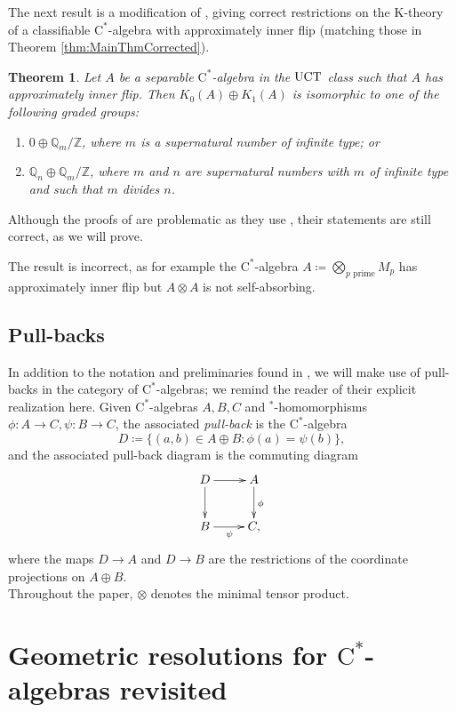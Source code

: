 \documentclass[a4paper,10pt]{amsart}
\newcommand{\T}[1]{\textup{#1}}
\newcommand{\cstar}{\ensuremath{\mathrm C^\ast}}
\newcommand{\Star}{{}^\ast}
\newcounter{theorem}
\newtheorem{thm}[theorem]{Theorem}
\numberwithin{equation}{section}
\numberwithin{theorem}{section}
\newcommand{\Q}{\mathbb{Q}}
\newcommand{\Z}{\mathbb{Z}}
\begin{document}
The next result is a modification of \cite[Theorem 6.1]{aifK}, giving correct restrictions on the K-theory of a classifiable $\cstar$-algebra with approximately inner flip (matching those in Theorem \ref{thm:MainThmCorrected}).

\begin{thm}
\label{thm:NecessaryCorrected}
Let $A$ be a separable $\cstar$-algebra in the $\T{UCT}$ class  such that $A$ has approximately inner flip.
Then $K_0(A)\oplus K_1(A)$ is isomorphic to one of the following graded groups:
\begin{enumerate}
\item $0 \oplus \Q_m/\Z$, where $m$ is a supernatural number of infinite type; or
\item $\Q_n \oplus \Q_m/\Z$, where $m$ and $n$ are supernatural numbers with $m$ of infinite type and such that $m$ divides $n$.
\end{enumerate}
\end{thm}

Although the proofs of \cite[Lemmas 6.2-6.4]{aifK} are problematic as they use \cite[Lemma 4.1]{aifK}, their statements are still correct, as we will prove.

The result \cite[Corollary 7.4]{aifK} is incorrect, as for example the $\cstar$-algebra $A \coloneqq \bigotimes_{p \text{ prime}} M_p$ has approximately inner flip but $A \otimes A$ is not self-absorbing.


\subsection*{Pull-backs}
In addition to the notation and preliminaries found in \cite{aifK}, we will make use of pull-backs in the category of $\cstar$-algebras; we remind the reader of their explicit realization here.
Given $\cstar$-algebras $A,B,C$ and $\Star$-homomorphisms $\phi \colon A \to C, \psi \colon B \to C$, the associated \emph{pull-back} is the $\cstar$-algebra
\[ D \coloneqq \{(a,b) \in A \oplus B : \phi(a)=\psi(b)\}, \]
and the associated pull-back diagram is the commuting diagram
\[ \xymatrix{
D \ar[r]\ar[d] & A \ar[d]^{\phi} \\ B\ar[r]_{\psi} & C, } \]
where the maps $D \to A$ and $D \to B$ are the restrictions of the coordinate projections on $A\oplus B$.\\

Throughout the paper, $\otimes$ denotes the minimal tensor product.

\section{Geometric resolutions for $\cstar$-algebras revisited}
\label{sec:geores}
\end{document}
